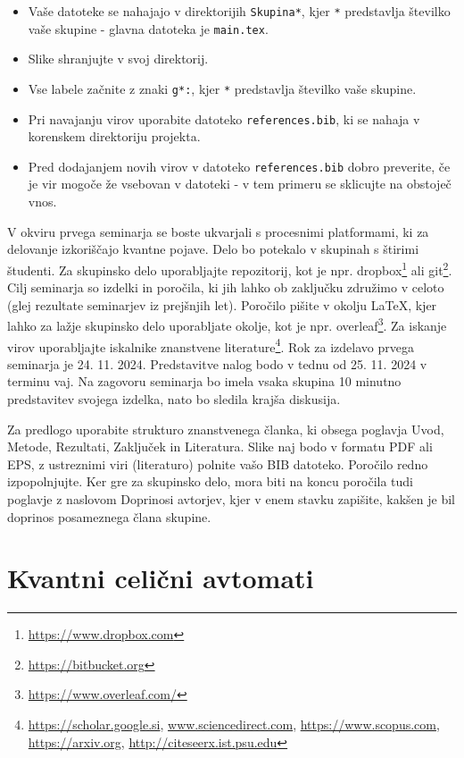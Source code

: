\begin{itemize}
\item Vaše datoteke se nahajajo v direktorijih \texttt{Skupina*}, kjer \texttt{*} predstavlja številko vaše skupine - glavna datoteka je \texttt{main.tex}.
\item Slike shranjujte v svoj direktorij.
\item Vse labele začnite z znaki \texttt{g*:}, kjer \texttt{*} predstavlja številko vaše skupine.
\item Pri navajanju virov uporabite datoteko \texttt{references.bib}, ki se nahaja v korenskem direktoriju projekta.
\item Pred dodajanjem novih virov v datoteko \texttt{references.bib} dobro preverite, če je vir mogoče že vsebovan v datoteki - v tem primeru se sklicujte na obstoječ vnos.
\end{itemize}


V okviru prvega seminarja se boste ukvarjali s procesnimi platformami, ki za delovanje izkoriščajo kvantne pojave. Delo bo potekalo v skupinah s štirimi študenti. Za skupinsko delo uporabljajte repozitorij, kot je npr. dropbox\footnote{\url{https://www.dropbox.com}} ali git\footnote{\url{https://bitbucket.org}}. Cilj seminarja so izdelki in poročila, ki jih lahko ob zaključku združimo v celoto (glej rezultate seminarjev iz prejšnjih let). Poročilo pišite v okolju LaTeX, kjer lahko za lažje skupinsko delo uporabljate okolje, kot je npr. overleaf\footnote{\url{https://www.overleaf.com/}}. Za iskanje virov uporabljajte iskalnike znanstvene literature\footnote{\url{https://scholar.google.si}, \url{www.sciencedirect.com}, \url{https://www.scopus.com}, \url{https://arxiv.org}, \url{http://citeseerx.ist.psu.edu}}. Rok za izdelavo prvega seminarja je 24. 11. 2024. Predstavitve nalog bodo v tednu od 25. 11. 2024 v terminu vaj. Na zagovoru seminarja bo imela vsaka skupina 10 minutno predstavitev svojega izdelka, nato bo sledila krajša diskusija.

Za predlogo uporabite strukturo znanstvenega članka, ki obsega poglavja Uvod, Metode, Rezultati, Zaključek in Literatura. Slike naj bodo v formatu PDF ali EPS, z ustreznimi viri (literaturo) polnite vašo BIB datoteko. Poročilo redno izpopolnjujte. Ker gre za skupinsko delo, mora biti na koncu poročila tudi poglavje z naslovom Doprinosi avtorjev, kjer v enem stavku zapišite, kakšen je bil doprinos posameznega člana skupine.




\section*{Kvantni celični avtomati}
\label{g00:sec:qca}

